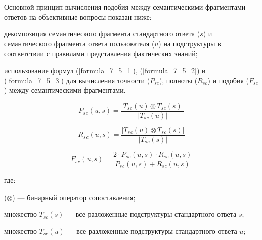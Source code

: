 Основной принцип вычисления подобия между семантическими фрагментами ответов на объективные вопросы показан ниже:

\begin{textitemize}
	\item декомпозиция семантического фрагмента стандартного ответа ($s$) и семантического фрагмента ответа пользователя ($u$) на подструктуры в соответствии с правилами представления фактических знаний;
	\item использование формул (\ref{formula_7_5_1}), (\ref{formula_7_5_2}) и (\ref{formula_7_5_3}) для вычисления точности ($P_{sc}$), полноты ($R_{sc}$) и подобия ($F_{sc}$) между семантическими фрагментами.  
\end{textitemize}

\begin{equation}    
	P_s{_c}(u,s) = \frac{|T_s{_c}(u)\otimes T_s{_c}(s)|}{|T_s{_c}(u)|}  
	\label{formula_7_5_1} 
\end{equation}  

\begin{equation}    
	R_s{_c}(u,s) = \frac{|T_s{_c}(u)\otimes T_s{_c}(s)|}{|T_s{_c}(s)|}  
	\label{formula_7_5_2} 
\end{equation}  

\begin{equation}    
	F_s{_c}(u,s) = \frac{2\cdot P_s{_c}(u,s)\cdot R_s{_c}(u,s)}{P_s{_c}(u,s) + R_s{_c}(u,s)}  
	\label{formula_7_5_3} 
\end{equation}

где:

\begin{textitemize}
	\item ($\otimes$) --- бинарный оператор сопоставления;
	
	\item множество $T_{sc}(s)$ --- все разложенные подструктуры стандартного ответа $s$;
	
	\item множество $T_{sc}(u)$ --- все разложенные подструктуры стандартного ответа $u$;
\end{textitemize}

